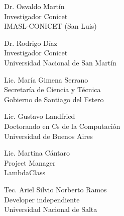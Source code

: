 \documentclass[a4paper,11pt]{article}
\begin{document}
 \vspace{0.3cm}

 \begin{paracol}{3}

  \scriptsize

\noindent Dr. Osvaldo Martín \\
Investigador Conicet \\
IMASL-CONICET (San Luis)


 \switchcolumn

\noindent Dr. Rodrigo Díaz \\
Investigador Conicet \\
Universidad Nacional de San Martín\\

 \switchcolumn

\noindent Lic. María Gimena Serrano \\
Secretaría de Ciencia y Técnica \\
Gobierno de Santiago del Estero \\

 \end{paracol}


\begin{paracol}{3}

  \scriptsize


\noindent  Lic. Gustavo Landfried \\
Doctorando en Cs de la Computación \\
Universidad de Buenos Aires

 \switchcolumn

\noindent  Lic. Martina Cántaro \\
Project Manager \\
LambdaClass

 \switchcolumn

\noindent Tec. Ariel Silvio Norberto Ramos\\
Developer independiente \\
Universidad Nacional de Salta

 \end{paracol}
\end{document}
